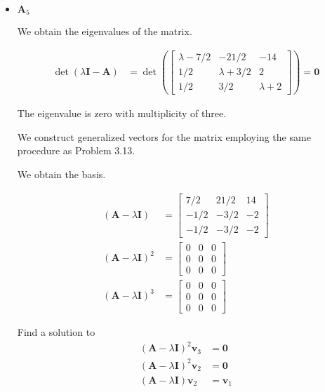 \begin{itemize}
 \item $\mathbf{A}_5$

We obtain the eigenvalues of the matrix.

\begin{align*}
 \det(\lambda \mathbf{I} - \mathbf{A}) &=
 \det\left(
  \begin{bmatrix}
    \lambda -7/2 & -21/2 & -14 \\
    1/2 & \lambda +3/2 & 2\\
    1/2 & 3/2 & \lambda +2
    \end{bmatrix}
\right) = \mathbf{0}
\end{align*}

The eigenvalue is zero with multiplicity of three.

We construct generalized vectors for the matrix
employing the same procedure as Problem 3.13.

We obtain the basis.

\begin{align*}
 (\mathbf{A}-\lambda\mathbf{I}) &= \begin{bmatrix}
        7/2 & 21/2 & 14 \\
        -1/2 & -3/2 & -2 \\
        -1/2 & -3/2 & -2
    \end{bmatrix}\\
 (\mathbf{A}-\lambda\mathbf{I})^2 &= \begin{bmatrix}
                                      0 & 0 & 0\\
                                      0 & 0 & 0\\
                                      0 & 0 & 0
                                     \end{bmatrix}
\\
 (\mathbf{A}-\lambda\mathbf{I})^3 &= \begin{bmatrix}
                                      0 & 0 & 0\\
                                      0 & 0 & 0\\
                                      0 & 0 & 0
                                     \end{bmatrix}
\end{align*}

Find a solution to
\begin{align*}
(\mathbf{A}-\lambda \mathbf{I})^2 \mathbf{v}_3& = \mathbf{0} \\
(\mathbf{A}-\lambda \mathbf{I})^2 \mathbf{v}_2& = \mathbf{0} \\
(\mathbf{A}-\lambda \mathbf{I}) \mathbf{v}_2& = \mathbf{v}_1 \\
\end{align*}


\end{itemize}

